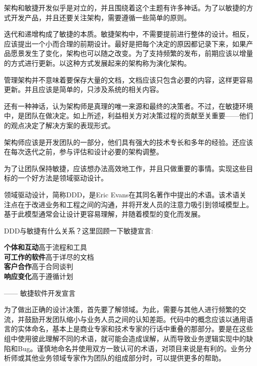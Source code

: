 
架构和敏捷开发似乎是对立的，并且围绕着这个主题有许多神话。为了以敏捷的方式开发产品，并且还要关注架构，需要遵循一些简单的原则。

迭代和递增构成了敏捷的本质。敏捷架构中，不需要提前进行整体的设计。相反，应该提出一个小而合理的前期设计。最好是把每个决定的原因都记录下来，如果产品愿景发生了变化，架构也可以随之改变。为了支持频繁的发布，前期应该以增量的方式进行更新。以这种方式发展起来的架构称为演化架构。

管理架构并不意味着要保存大量的文档，文档应该只包含必要的内容，这样更容易更新。并且应该是简单的，只涉及系统的相关内容。

还有一种神话，认为架构师是真理的唯一来源和最终的决策者。不过，在敏捷环境中，是团队在做决定。如上所述，利益相关方对决策过程的贡献至关重要——他们的观点决定了解决方案的表现形式。

架构师应该是开发团队的一部分，他们具有强大的技术专长和多年的经验。还应该在每次迭代之前，参与评估和设计必要的架构调整。

为了让团队保持敏捷，应该想办法高效地工作，并且只做重要的事情。实现这些目标的一个好方法是领域驱动设计。



领域驱动设计，简称DDD，是Eric Evans在其同名著作中提出的术语。该术语关注点在于改进业务和工程之间的沟通，并将开发人员的注意力吸引到领域模型上。基于此模型通常会让设计更容易理解，并随着模型的变化而发展。

DDD与敏捷有什么关系？这里回顾一下敏捷宣言:

\begin{flushleft}
\noindent
\hspace*{0.8cm}\textbf{个体和互动}高于流程和工具 \\
\hspace*{0.8cm}\textbf{可工作的软件}高于详尽的文档 \\
\hspace*{0.8cm}\textbf{客户合作}高于合同谈判 \\
\hspace*{0.8cm}\textbf{响应变化}高于遵循计划

\noindent
\hspace*{0.8cm} —— 敏捷软件开发宣言
\end{flushleft}


为了做出正确的设计决策，首先要了解领域。为此，需要与其他人进行频繁的交流，并鼓励开发团队缩小与业务人员之间的认知差距。代码中的概念应该以通用语言的实体命名，基本上是商业专家和技术专家的行话中重叠的那部分。要是在这些组中使用彼此理解不同的术语，就可能会造成误解，从而导致业务逻辑实现中的缺陷和Bug。谨慎地命名并使用双方一致认可的术语，对项目来说是有利的。业务分析师或其他业务领域专家作为团队的组成部分时，可以提供更多的帮助。

